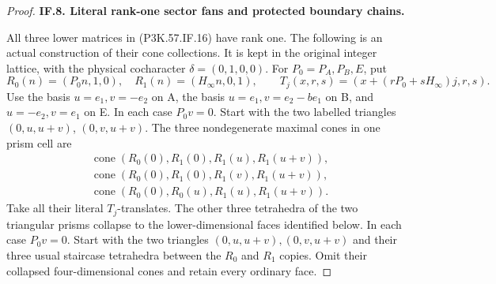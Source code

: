 \begin{proof}
\par\medskip\noindent\textbf{IF.8. Literal rank-one sector fans and protected boundary chains.}\par\nopagebreak[4]

All three lower matrices in (P3K.57.IF.16) have rank one. The following is an
actual construction of their cone collections. It is kept in the original
integer lattice, with the physical cocharacter \(\delta=(0,1,0,0)\).
For \(P_0=P_A,P_B,E\), put
\[
 R_0(n)=(P_0n,1,0),\quad R_1(n)=(H_\infty n,0,1),\qquad
 T_j(x,r,s)=(x+(rP_0+sH_\infty)j,r,s).                 \tag{P3K.57.IF.24}
\]
Use the basis \(u=e_1,v=-e_2\) on A, the basis
\(u=e_1,v=e_2-be_1\) on B, and \(u=-e_2,v=e_1\) on E.
In each case \(P_0v=0\). Start with the two labelled
triangles \((0,u,u+v)\), \((0,v,u+v)\). The three
nondegenerate maximal cones in one prism cell are
\[
 \begin{split}
 &\operatorname{cone}(R_0(0),R_1(0),R_1(u),R_1(u+v)),\\
 &\operatorname{cone}(R_0(0),R_1(0),R_1(v),R_1(u+v)),\\
 &\operatorname{cone}(R_0(0),R_0(u),R_1(u),R_1(u+v)).
 \end{split}                                             \tag{P3K.57.IF.24a}
\]
Take all their literal \(T_j\)-translates. The other
three tetrahedra of the two triangular prisms collapse
to the lower-dimensional faces identified below.
In each case \(P_0v=0\). Start with the two triangles
\((0,u,u+v),(0,v,u+v)\) and their three usual staircase tetrahedra
between the \(R_0\) and \(R_1\) copies. Omit their collapsed
four-dimensional cones and retain every ordinary face.


\end{proof}

